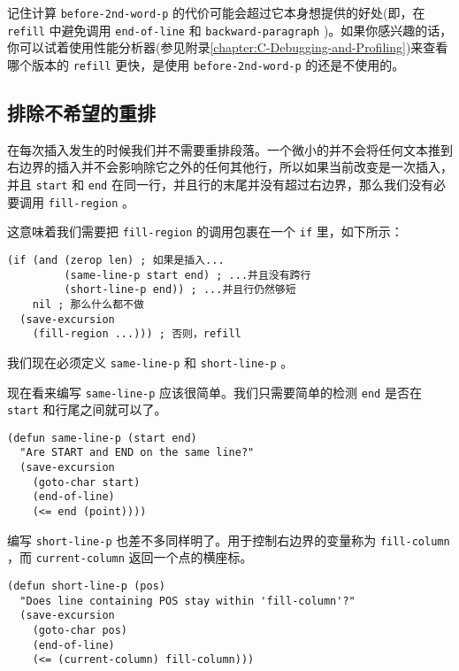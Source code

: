 记住计算 \texttt{before-2nd-word-p} 的代价可能会超过它本身想提供的好处(即，在 \texttt{refill} 中避免调用 \texttt{end-of-line} 和 \texttt{backward-paragraph} )。如果你感兴趣的话，你可以试着使用性能分析器(参见附录\ref{chapter:C-Debugging-and-Profiling})来查看哪个版本的 \texttt{refill} 更快，是使用 \texttt{before-2nd-word-p} 的还是不使用的。

\subsection{排除不希望的重排}
\label{section:07-Eliminating-Unwanted-Filling}

在每次插入发生的时候我们并不需要重排段落。一个微小的并不会将任何文本推到右边界的插入并不会影响除它之外的任何其他行，所以如果当前改变是一次插入，并且 \texttt{start} 和 \texttt{end} 在同一行，并且行的末尾并没有超过右边界，那么我们没有必要调用 \texttt{fill-region} 。

这意味着我们需要把 \texttt{fill-region} 的调用包裹在一个 \texttt{if} 里，如下所示：

\begin{verbatim}
(if (and (zerop len) ; 如果是插入...
         (same-line-p start end) ; ...并且没有跨行
         (short-line-p end)) ; ...并且行仍然够短
    nil ; 那么什么都不做
  (save-excursion
    (fill-region ...))) ; 否则，refill
\end{verbatim}

我们现在必须定义 \texttt{same-line-p} 和 \texttt{short-line-p} 。

现在看来编写 \texttt{same-line-p} 应该很简单。我们只需要简单的检测 \texttt{end} 是否在 \texttt{start} 和行尾之间就可以了。

\begin{verbatim}
(defun same-line-p (start end)
  "Are START and END on the same line?"
  (save-excursion
    (goto-char start)
    (end-of-line)
    (<= end (point))))
\end{verbatim}

编写 \texttt{short-line-p} 也差不多同样明了。用于控制右边界的变量称为 \texttt{fill-column} ，而 \texttt{current-column} 返回一个点的横座标。

\begin{verbatim}
(defun short-line-p (pos)
  "Does line containing POS stay within 'fill-column'?"
  (save-excursion
    (goto-char pos)
    (end-of-line)
    (<= (current-column) fill-column)))
\end{verbatim}

